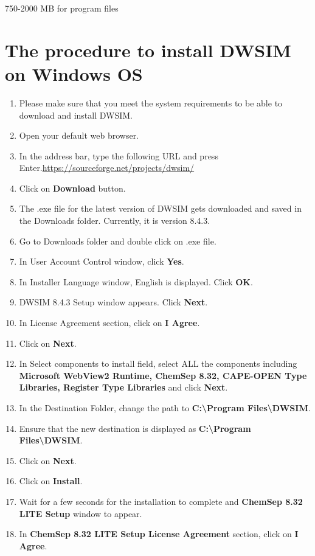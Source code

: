 \documentclass[a4paper,12pt]{article}
\begin{document}
750-2000 MB for program files

\section{The procedure to install DWSIM on Windows OS}

\begin{enumerate}
\item Please make sure that you meet the system requirements to be able to download and install DWSIM.
\item Open your default web browser.
\item In the address bar, type the following URL and press Enter.\newline \url{https://sourceforge.net/projects/dwsim/}
\item Click on \textbf{Download} button.
\item The .exe file for the latest version of DWSIM gets downloaded and saved in the Downloads folder. Currently, it is version 8.4.3.
\item Go to Downloads folder and double click on .exe file.
\item In User Account Control window, click \textbf{Yes}.
\item In Installer Language window, English is displayed. Click \textbf{OK}.
\item DWSIM 8.4.3 Setup window appears. Click \textbf{Next}.
\item In License Agreement section, click on \textbf{I Agree}.
\item Click on \textbf{Next}.
\item In Select components to install field, select ALL the components including \textbf{Microsoft WebView2 Runtime, ChemSep 8.32, CAPE-OPEN Type Libraries, Register Type Libraries} and click \textbf{Next}.
\item In the Destination Folder, change the path to \textbf{C:\textbackslash Program Files\textbackslash DWSIM}.
\item Ensure that the new destination is displayed as \textbf{C:\textbackslash Program Files\textbackslash DWSIM}.
\item Click on \textbf{Next}.
\item Click on \textbf{Install}.
\item Wait for a few seconds for the installation to complete and \textbf{ChemSep 8.32 LITE Setup} window to appear.
\item In \textbf{ChemSep 8.32 LITE Setup License Agreement} section, click on \textbf{I Agree}.

\end{enumerate}
\end{document}

